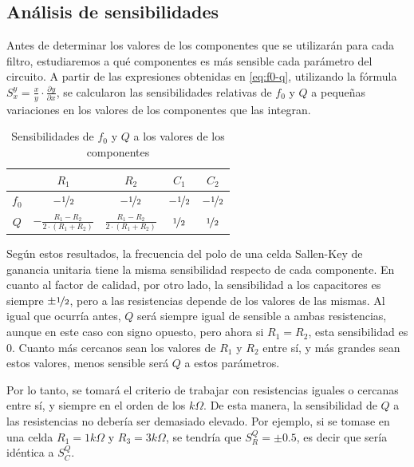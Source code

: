 \documentclass[../../tc_tp5_main.tex]{subfiles}
\begin{document}
\subsection{An\'alisis de sensibilidades} 

Antes de determinar los valores de los componentes que se utilizar\'an para cada filtro, estudiaremos a qu\'e componentes es m\'as sensible cada par\'ametro del circuito. A partir de las expresiones obtenidas en \ref{eq:f0-q}, utilizando la f\'ormula $S_x^y = \frac{x}{y} \cdot \frac{\partial y}{\partial x}$, se calcularon las sensibilidades relativas de $f_0$ y $Q$ a peque\~nas variaciones en los valores de los componentes que las integran.

\begin{table}[H]
	\centering
	\begin{tabular}{|c||c|c|c|c|}
	\hline
      	& $R_1$                                       & $R_2$                                     & $C_1$              & $C_2$              \\ \hline \hline
	$f_0$ & $-\nicefrac{1}{2}$                          & $-\nicefrac{1}{2}$                        & $-\nicefrac{1}{2}$ & $-\nicefrac{1}{2}$ \\ \hline
	$Q$   & $ - \frac{R_1 - R_2}{2 \cdot (R_1 + R_2)} $ & $ \frac{R_1 - R_2}{2 \cdot (R_1 + R_2)} $ & $\nicefrac{1}{2}$ & $\nicefrac{1}{2}$  \\ \hline
	\end{tabular}
	
	\caption{Sensibilidades de $f_0$ y $Q$ a los valores de los componentes}
\end{table}

Seg\'un estos resultados, la frecuencia del polo de una celda Sallen-Key de ganancia unitaria tiene la misma sensibilidad respecto de cada componente. En cuanto al factor de calidad, por otro lado, la sensibilidad a los capacitores es siempre $\pm \nicefrac{1}{2}$, pero a las resistencias depende de los valores de las mismas. Al igual que ocurr\'ia antes, $Q$ ser\'a siempre igual de sensible a ambas resistencias, aunque en este caso con signo opuesto, pero ahora si $R_1 = R_2$, esta sensibilidad es 0. Cuanto m\'as cercanos sean los valores de $R_1$ y $R_2$ entre s\'i, y m\'as grandes sean estos valores, menos sensible ser\'a $Q$ a estos par\'ametros. \par 

Por lo tanto, se tomar\'a el criterio de trabajar con resistencias iguales o cercanas entre s\'i, y siempre en el orden de los $k\Omega$. De esta manera, la sensibilidad de $Q$ a las resistencias no deber\'ia ser demasiado elevado. Por ejemplo, si se tomase en una celda $R_1 = 1k\Omega$ y $R_3 = 3k\Omega$, se tendr\'ia que $S_R^Q = \pm 0.5$, es decir que ser\'ia id\'entica a $S_C^Q$.\par 
\end{document}
